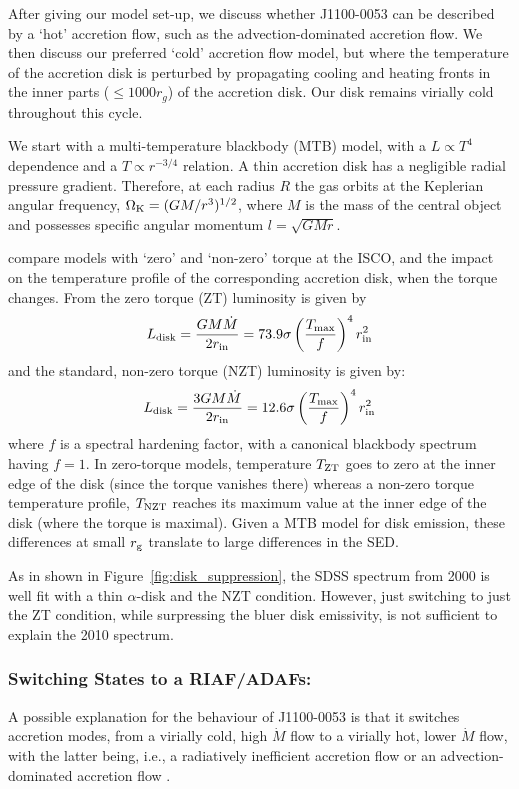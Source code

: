 \documentclass[a4paper,fleqn,usenatbib]{mnras}
\begin{document}
After giving our model set-up, we discuss whether J1100-0053 can be
described by a `hot' accretion flow, such as the advection-dominated
accretion flow. We then discuss our preferred `cold' accretion flow
model, but where the temperature of the accretion disk is perturbed by
propagating cooling and heating fronts in the inner parts ($\leq 1000
r_{g}$) of the accretion disk. Our disk remains virially cold
throughout this cycle.
 
We start with a multi-temperature blackbody (MTB) model, with a $L
\propto T^4$ dependence and a $T \propto r^{-3/4}$ relation. A thin
accretion disk has a negligible radial pressure gradient. Therefore,
at each radius $R$ the gas orbits at the Keplerian angular frequency,
$\Omega_{\rm K} = (GM/r^{3})^{1/2}$, where $M$ is the mass of the
central object and possesses specific angular momentum $l= \sqrt{GMr}$. 

\citet{Zimmerman2005} compare models with `zero' and `non-zero' torque
at the ISCO, and the impact on the temperature profile of the
corresponding accretion disk, when the torque changes.  From
\citet{Zimmerman2005} the zero torque (ZT) luminosity is given by
\begin{equation}
L_{\rm disk}   =  \frac{G M \dot{M}}  {2 r_{\rm in}}    = 73.9 \sigma\left ( \frac{T_{\rm max}}{f}  \right )^{4}  r^{2}_{\rm in} 
\end{equation}
and the standard, non-zero torque (NZT) luminosity is given by:
\begin{equation}
L_{\rm disk} = \frac{3 G M \dot{M}}  {2 r_{\rm in}}    = 12.6 \sigma\left ( \frac{T_{\rm max}}{f}  \right )^{4}  r^{2}_{\rm in} 
\end{equation} 
where $f$ is a spectral hardening factor, with 
a canonical blackbody spectrum having $f=1$. 
In zero-torque models, temperature $T_{\rm ZT}$ goes to zero at the
inner edge of the disk (since the torque vanishes there) whereas a
non-zero torque temperature profile, $T_{\rm NZT}$ reaches its maximum
value at the inner edge of the disk (where the torque is maximal).
Given a MTB model for disk emission, these differences at small
$r_{\rm g}$ translate to large differences in the SED.

As in shown in Figure~\ref{fig:disk_suppression}, the SDSS spectrum
from 2000 is well fit with a thin \citet{SS73} $\alpha$-disk and the
NZT condition.  However, just switching to just the ZT condition,
while surpressing the bluer disk emissivity, is not sufficient to
explain the 2010 spectrum.

\subsubsection{Switching States to a RIAF/ADAFs:}
A possible explanation for the behaviour of J1100-0053 is that it
switches accretion modes, from a virially cold, high $\dot{M}$ flow to a
virially hot, lower $\dot{M}$ flow, with the latter being, i.e., a
radiatively inefficient accretion flow \citep[RIAF; ][]{Narayan1998,
Quataert2001} or an advection-dominated accretion flow \citep[ADAF;
][and references therein]{YuanNarayan2014}.
\end{document}
